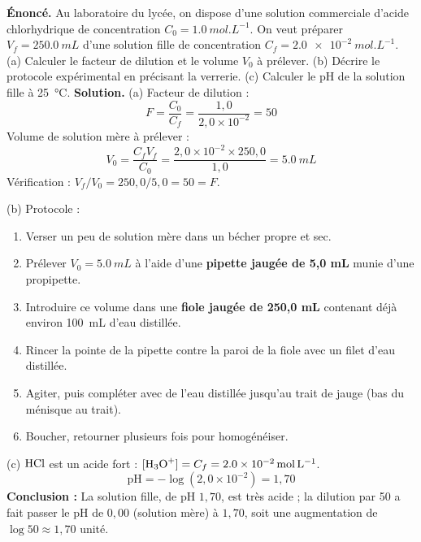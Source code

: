 \documentclass[11pt]{article}
\begin{document}
\begin{exoresolu}
\textbf{Énoncé.} Au laboratoire du lycée, on dispose d'une solution commerciale d'acide chlorhydrique de concentration $C_0 = \SI{1,0}{mol.L^{-1}}$. On veut préparer $V_f = \SI{250,0}{mL}$ d'une solution fille de concentration $C_f = \SI{2,0e-2}{mol.L^{-1}}$. (a) Calculer le facteur de dilution et le volume $V_0$ à prélever. (b) Décrire le protocole expérimental en précisant la verrerie. (c) Calculer le pH de la solution fille à \SI{25}{\celsius}.
\tcblower
\textbf{Solution.}
(a) Facteur de dilution :
\[ F = \frac{C_0}{C_f} = \frac{1{,}0}{2{,}0\times 10^{-2}} = 50 \]
Volume de solution mère à prélever :
\[ V_0 = \frac{C_f V_f}{C_0} = \frac{2{,}0\times 10^{-2} \times 250{,}0}{1{,}0} = \SI{5,0}{mL} \]
Vérification : $V_f/V_0 = 250{,}0/5{,}0 = 50 = F$. \checkmark

(b) Protocole :
\begin{enumerate}
\item Verser un peu de solution mère dans un bécher propre et sec.
\item Prélever $V_0 = \SI{5,0}{mL}$ à l'aide d'une \textbf{pipette jaugée de 5,0 mL} munie d'une propipette.
\item Introduire ce volume dans une \textbf{fiole jaugée de 250,0 mL} contenant déjà environ \SI{100}{mL} d'eau distillée.
\item Rincer la pointe de la pipette contre la paroi de la fiole avec un filet d'eau distillée.
\item Agiter, puis compléter avec de l'eau distillée jusqu'au trait de jauge (bas du ménisque au trait).
\item Boucher, retourner plusieurs fois pour homogénéiser.
\end{enumerate}

(c) $\ce{HCl}$ est un acide fort : $[\ce{H3O+}] = C_f = \SI{2,0e-2}{mol.L^{-1}}$.
\[ \mathrm{pH} = -\log(2{,}0\times 10^{-2}) = 1{,}70 \]
\textbf{Conclusion :} La solution fille, de pH $1{,}70$, est très acide ; la dilution par 50 a fait passer le pH de $0{,}00$ (solution mère) à $1{,}70$, soit une augmentation de $\log 50 \approx 1{,}70$ unité.
\end{exoresolu}
\end{document}
